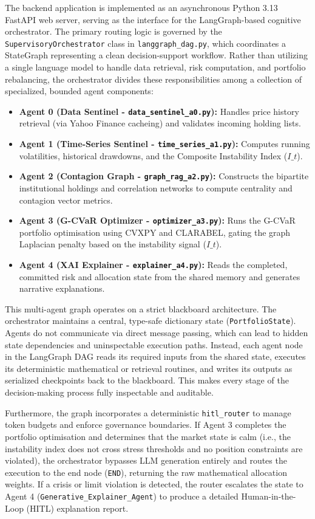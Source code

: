\documentclass[11pt]{article}
\begin{document}
The backend application is implemented as an asynchronous Python 3.13 FastAPI web server, serving as the interface for the LangGraph-based cognitive orchestrator. The primary routing logic is governed by the \texttt{SupervisoryOrchestrator} class in \texttt{langgraph\_dag.py}, which coordinates a StateGraph representing a clean decision-support workflow. Rather than utilizing a single language model to handle data retrieval, risk computation, and portfolio rebalancing, the orchestrator divides these responsibilities among a collection of specialized, bounded agent components:
\begin{itemize}
    \item \textbf{Agent 0 (Data Sentinel - \texttt{data\_sentinel\_a0.py}):} Handles price history retrieval (via Yahoo Finance cacheing) and validates incoming holding lists.
    \item \textbf{Agent 1 (Time-Series Sentinel - \texttt{time\_series\_a1.py}):} Computes running volatilities, historical drawdowns, and the Composite Instability Index ($I\_t$).
    \item \textbf{Agent 2 (Contagion Graph - \texttt{graph\_rag\_a2.py}):} Constructs the bipartite institutional holdings and correlation networks to compute centrality and contagion vector metrics.
    \item \textbf{Agent 3 (G-CVaR Optimizer - \texttt{optimizer\_a3.py}):} Runs the G-CVaR portfolio optimisation using CVXPY and CLARABEL, gating the graph Laplacian penalty based on the instability signal ($I\_t$).
    \item \textbf{Agent 4 (XAI Explainer - \texttt{explainer\_a4.py}):} Reads the completed, committed risk and allocation state from the shared memory and generates narrative explanations.
\end{itemize}

This multi-agent graph operates on a strict blackboard architecture. The orchestrator maintains a central, type-safe dictionary state (\texttt{PortfolioState}). Agents do not communicate via direct message passing, which can lead to hidden state dependencies and uninspectable execution paths. Instead, each agent node in the LangGraph DAG reads its required inputs from the shared state, executes its deterministic mathematical or retrieval routines, and writes its outputs as serialized checkpoints back to the blackboard. This makes every stage of the decision-making process fully inspectable and auditable.

Furthermore, the graph incorporates a deterministic \texttt{hitl\_router} to manage token budgets and enforce governance boundaries. If Agent 3 completes the portfolio optimisation and determines that the market state is calm (i.e., the instability index does not cross stress thresholds and no position constraints are violated), the orchestrator bypasses LLM generation entirely and routes the execution to the end node (\texttt{END}), returning the raw mathematical allocation weights. If a crisis or limit violation is detected, the router escalates the state to Agent 4 (\texttt{Generative\_Explainer\_Agent}) to produce a detailed Human-in-the-Loop (HITL) explanation report.
\end{document}
